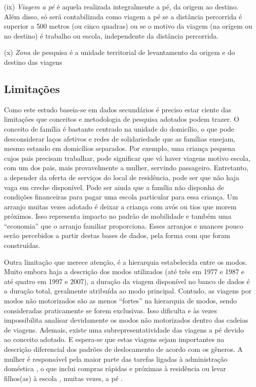 \begin{compactitem}[]
\item (ix) \emph{Viagem a pé} é aquela realizada integralmente a pé, da origem ao destino. Além disso, só será contabilizada como viagem a pé se a distância percorrida é superior a 500 metros (ou cinco quadras) ou se o motivo da viagem (na origem ou no destino) é trabalho ou escola, independente da distância percorrida.

\item (x) \emph{Zona} de pesquisa é a unidade territorial de levantamento da origem e do destino das viagens
\end{compactitem}

\subsection{Limitações}\label{subsec:limitacoes}

Como este estudo baseia-se em dados secundários é preciso estar ciente das limitações que conceitos e metodologia de pesquisa adotados podem trazer. O conceito de família é bastante centrado na unidade do domicílio, o que pode desconsiderar laços afetivos e redes de solidariedade que as famílias ensejam, mesmo estando em domicílios separados. Por exemplo, uma criança pequena cujos pais precisam trabalhar, pode significar que vá haver viagens motivo escola, com um dos pais, mais provavelmente a mulher, servindo passageiro. Entretanto, a depender da oferta de serviços do local de residência, pode ser que não haja vaga em creche disponível. Pode ser ainda que a família não disponha de  condições financeiras para pagar uma escola particular para essa criança. Um arranjo muitas vezes adotado é deixar a criança com avós ou tios que morem próximos. Isso representa impacto no padrão de mobilidade e também uma ``economia'' que o arranjo familiar proporciona. Esses arranjos e nuances pouco serão percebidos a partir destas bases de dados, pela forma com que foram construídas.

Outra limitação que merece atenção, é a hierarquia estabelecida entre os modos. Muito embora haja a descrição dos modos utilizados (até três em 1977 e 1987 e até quatro em 1997 e 2007), a duração da viagem disponível no banco de dados é a duração total, geralmente atribuída ao modo principal. Contudo, as viagens por modos não motorizados são as menos ``fortes'' na hierarquia de modos, sendo consideradas praticamente se forem exclusivas. Isso dificulta e às vezes impossibilita analisar devidamente os modos não motorizados dentro das cadeias de viagens. 
Ademais, existe uma subrepresentatividade das viagens a pé devido ao conceito adotado. E espera-se que estas viagens sejam importantes na descrição diferencial dos padrões de deslocamento de acordo com os gêneros. A mulher é responsável pela maior parte das tarefas ligadas à administração doméstica \cite{ROOT1999,VANCE2007}, o que inclui compras rápidas e próximas à residência ou levar filhos(as) à escola \cite{FOX1983,FAGNANI1983,IBIPO1992,MCNUCKIN2005,SCHWANEN2002,SONG2003,CRANE2007}, muitas vezes, a pé \cite{VASCONCELLOS2001}.

